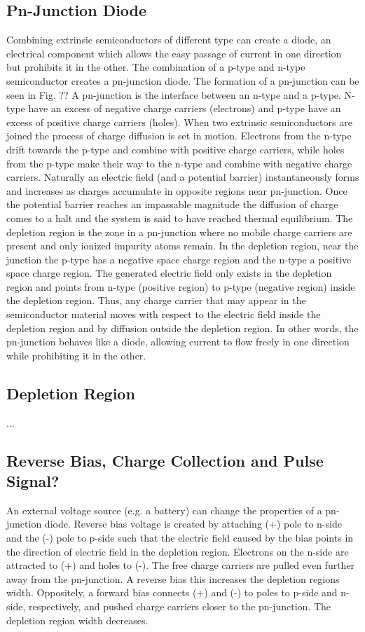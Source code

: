 \subsection{Pn-Junction Diode}
Combining extrinsic semiconductors of different type can create a diode, an electrical component which allows the easy passage of current in one direction but prohibits it in the other. The combination of a p-type and n-type semiconductor creates a pn-junction diode. The formation of a pn-junction can be seen in Fig. ??
A pn-junction is the interface between an n-type and a p-type. N-type have an excess of negative charge carriers (electrons) and p-type have an excess of positive charge carriers (holes). When two extrinsic semiconductors are joined the process of charge diffusion is set in motion. Electrons from the n-type drift towards the p-type and combine with positive charge carriers, while holes from the p-type make their way to the n-type and combine with negative charge carriers. Naturally an electric field (and a potential barrier) instantaneously forms and increases as charges accumulate in opposite regions near pn-junction. Once the potential barrier reaches an impassable magnitude the diffusion of charge comes to a halt and the system is said to have reached thermal equilibrium. The depletion region is the zone in a pn-junction where no mobile charge carriers are present and only ionized impurity atoms remain. In the depletion region, near the junction the p-type has a negative space charge region and the n-type a positive space charge region. The generated electric field only exists in the depletion region and points from n-type (positive region) to p-type (negative region) inside the depletion region. Thus, any charge carrier that may appear in the semiconductor material moves with respect to the electric field inside the depletion region and by diffusion outside the depletion region. In other words, the pn-junction behaves like a diode, allowing current to flow freely in one direction while prohibiting it in the other.

\subsection{Depletion Region}
...

\subsection{Reverse Bias, Charge Collection and Pulse Signal?} %
An external voltage source (e.g. a battery) can change the properties of a pn-junction diode. Reverse bias voltage is created by attaching (+) pole to n-side and the (-) pole to p-side such that the electric field caused by the bias points in the direction of electric field in the depletion region.  Electrons on the n-side are attracted to (+) and holes to (-). The free charge carriers are pulled even further away from the pn-junction. A reverse bias this increases the depletion regions width.
Oppositely, a forward bias connects (+) and (-) to poles to p-side and n-side, respectively, and pushed charge carriers closer to the pn-junction. The depletion region width decreases.

